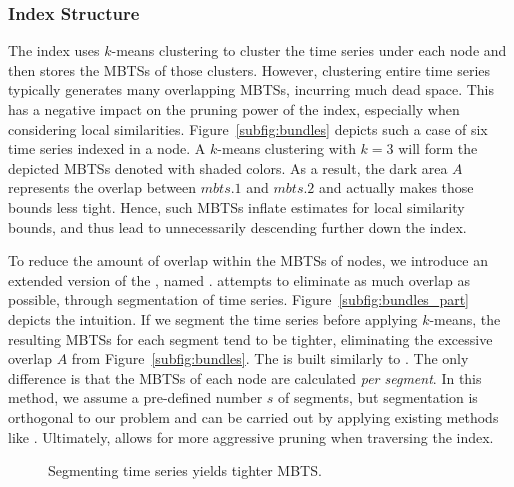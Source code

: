 \subsubsection{Index Structure}
\label{subsec:structure_sbtsr}
The \btsr index uses $k$-means clustering to cluster the time series under each node and then stores the MBTSs of those clusters. However, clustering entire time series typically generates many overlapping MBTSs, incurring much dead space. This has a negative impact on the pruning power of the index, especially when considering local similarities. Figure~\ref{subfig:bundles} depicts such a case of six time series indexed in a node. A $k$-means clustering with $k=3$ will form the depicted MBTSs denoted with shaded colors. As a result, the dark area $A$ represents the overlap between $mbts.1$ and $mbts.2$ and actually makes those bounds less tight. Hence, such MBTSs inflate estimates for local similarity bounds, and thus lead to unnecessarily descending further down the index.

To reduce the amount of overlap within the MBTSs of nodes, we introduce an extended version of the \btsr, named \sbtsr. \sbtsr attempts to eliminate as much overlap as possible, through segmentation of time series. Figure~\ref{subfig:bundles_part} depicts the intuition. If we segment the time series before applying $k$-means, the resulting MBTSs for each segment tend to be tighter, eliminating the excessive overlap $A$ from Figure~\ref{subfig:bundles}. The \sbtsr is built similarly to \btsr. The only difference is that the MBTSs of each node are calculated \textit{per segment}. In this method, we assume a pre-defined number $s$ of segments, but segmentation is orthogonal to our problem and can be carried out by applying existing methods like \cite{bingham2006segmentation}. Ultimately, \sbtsr allows for more aggressive pruning when traversing the index.

\begin{figure}[tb]
 \centering
 \vspace{-10pt} 
 \caption{Segmenting time series yields tighter MBTS.}
 \label{fig:proof_partition}
\end{figure}


